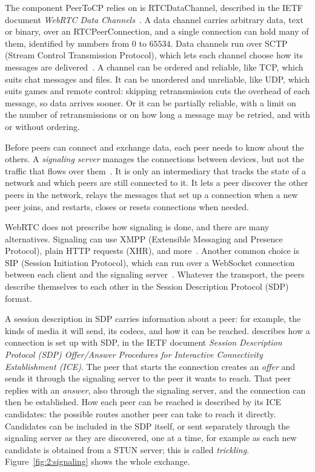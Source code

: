 The component PeerToCP relies on is RTCDataChannel, described in the IETF document \emph{WebRTC Data Channels}~\citep{rfc8831}. A data channel carries arbitrary data, text or binary, over an RTCPeerConnection, and a single connection can hold many of them, identified by numbers from $0$ to $65534$. Data channels run over SCTP (Stream Control Transmission Protocol), which lets each channel choose how its messages are delivered~\citep{rfc8831}. A channel can be ordered and reliable, like TCP, which suits chat messages and files. It can be unordered and unreliable, like UDP, which suits games and remote control: skipping retransmission cuts the overhead of each message, so data arrives sooner. Or it can be partially reliable, with a limit on the number of retransmissions or on how long a message may be retried, and with or without ordering.

Before peers can connect and exchange data, each peer needs to know about the others. A \emph{signaling server} manages the connections between devices, but not the traffic that flows over them~\citep{rfc8839}. It is only an intermediary that tracks the state of a network and which peers are still connected to it. It lets a peer discover the other peers in the network, relays the messages that set up a connection when a new peer joins, and restarts, closes or resets connections when needed.

WebRTC does not prescribe how signaling is done, and there are many alternatives. Signaling can use XMPP (Extensible Messaging and Presence Protocol), plain HTTP requests (XHR), and more~\citep{sredojev2015webrtc}. Another common choice is SIP (Session Initiation Protocol), which can run over a WebSocket connection between each client and the signaling server~\citep{adeyeye2013determining}. Whatever the transport, the peers describe themselves to each other in the Session Description Protocol (SDP) format.

A session description in SDP carries information about a peer: for example, the kinds of media it will send, its codecs, and how it can be reached. \citet{rfc8839} describes how a connection is set up with SDP, in the IETF document \emph{Session Description Protocol (SDP) Offer/Answer Procedures for Interactive Connectivity Establishment (ICE)}. The peer that starts the connection creates an \emph{offer} and sends it through the signaling server to the peer it wants to reach. That peer replies with an \emph{answer}, also through the signaling server, and the connection can then be established. How each peer can be reached is described by its ICE candidates: the possible routes another peer can take to reach it directly. Candidates can be included in the SDP itself, or sent separately through the signaling server as they are discovered, one at a time, for example as each new candidate is obtained from a STUN server; this is called \emph{trickling}. Figure~\ref{fig:2:signaling} shows the whole exchange.

